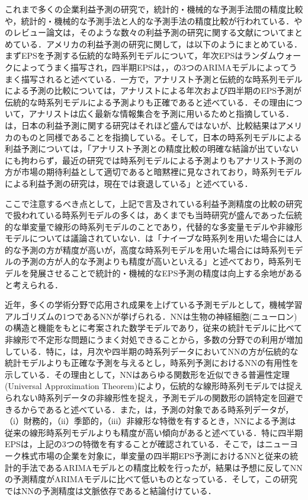 \documentclass[a4paper，11pt]{jsarticle}
\begin{document}
これまで多くの企業利益予測の研究で，統計的・機械的な予測手法間の精度比較や，統計的・機械的な予測手法と人的な予測手法の精度比較が行われている．\cite{sakurai1990}や\cite{ota2006}のレビュー論文は，そのような数々の利益予測の研究に関する文献についてまとめている．アメリカの利益予測の研究に関して，\cite{sakurai1990}は以下のようにまとめている．まずEPSを予測する伝統的な時系列モデルについて，年次EPSはランダムウォークによってうまく描写され，四半期EPSは\cite*{brown1979univariate}，\cite{griffin1977time}，\cite{foster1977quarterly}の3つのARIMAモデルによってうまく描写されると述べている．一方で，アナリスト予測と伝統的な時系列モデルによる予測の比較については，アナリストによる年次および四半期のEPS予測が伝統的な時系列モデルによる予測よりも正確であると述べている．その理由について，アナリストは広く最新な情報集合を予測に用いるためと指摘している．\cite{ota2006}は，日本の利益予測に関する研究はそれほど盛んではないが、比較結果はアメリカのものと同様であることを指摘している。そして，日本の時系列モデルによる利益予測については，「アナリスト予測との精度比較の明確な結論が出ていないにも拘わらず，最近の研究では時系列モデルによる予測よりもアナリスト予測の方が市場の期待利益として適切であると暗黙裡に見なされており，時系列モデルによる利益予測の研究は，現在では衰退している」と述べている．

ここで注意するべき点として，上記で言及されている利益予測精度の比較の研究で扱われている時系列モデルの多くは，あくまでも当時研究が盛んであった伝統的な単変量で線形の時系列モデルのことであり，代替的な多変量モデルや非線形モデルについては議論されていない．\cite{ota2006}は「ナイーブな時系列を用いた場合には人的な予測の方が精度が高いが，高度な時系列モデルを用いた場合には時系列モデルの予測の方が人的な予測よりも精度が高いといえる」と述べており，時系列モデルを発展させることで統計的・機械的なEPS予測の精度は向上する余地があると考えられる．

近年，多くの学術分野で応用され成果を上げている予測モデルとして，機械学習アルゴリズムの1つであるNNが挙げられる．NNは生物の神経細胞(ニューロン)の構造と機能をもとに考案された数学モデルであり，従来の統計モデルに比べて非線形で不定形な問題にうまく対処できることから，多数の分野での利用が増加している\citep*{tkavc2016artificial}．特に，\cite{hill1996neural}は，月次や四半期の時系列データにおいてNNの方が伝統的な統計モデルよりも正確な予測を与えるとし，時系列予測におけるNNの有用性を示している．その理由として，NNはあらゆる関数形を近似できる普遍性定理(Universal Approximation Theorem)\citep{hornik1989multilayer}により，伝統的な線形時系列モデルでは捉えられない時系列データの非線形性を捉え，予測モデルの関数形の誤特定を回避できるからであると述べている．また，\cite{hill1994artificial}は，予測の対象である時系列データが，（i）財務的，（ii）季節的，（iii）非線形な特徴を有するとき，NNによる予測は従来の線形時系列モデルよりも精度が高い傾向があると述べている．特に四半期EPSは，上記の3つの特徴を有することが確認されている\citep*{hopwood1986univariate}．そこで，\cite{callen1996neural}はニューヨーク株式市場の企業を対象に，単変量の四半期EPS予測におけるNNと従来の統計的手法であるARIMAモデルとの精度比較を行ったが，結果は予想に反してNNの予測精度がARIMAモデルに比べて低いものとなっている．そして，この研究ではNNの予測精度は文脈依存であると結論付けている．
\end{document}

